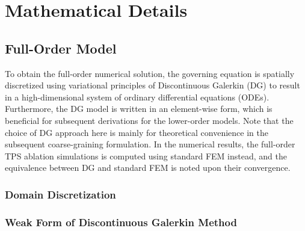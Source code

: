 \appendix

\section{Mathematical Details}\label{app_implementation}

\subsection{Full-Order Model}

To obtain the full-order numerical solution, the governing equation is spatially discretized using variational principles of Discontinuous Galerkin (DG) to result in a high-dimensional system of ordinary differential equations (ODEs). Furthermore, the DG model is written in an element-wise form, which is beneficial for subsequent derivations for the lower-order models. Note that the choice of DG approach here is mainly for theoretical convenience in the subsequent coarse-graining formulation. In the numerical results, the full-order TPS ablation simulations is computed using standard FEM instead, and the equivalence between DG and standard FEM is noted upon their convergence.

\subsubsection{Domain Discretization}

\subsubsection{Weak Form of Discontinuous Galerkin Method}

